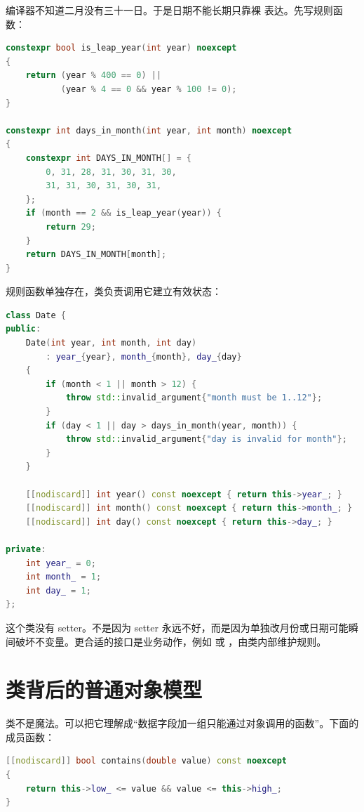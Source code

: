 编译器不知道二月没有三十一日。于是日期不能长期只靠裸  表达。先写规则函数：

\begin{lstlisting}[language=C++,caption={日期规则函数}]
constexpr bool is_leap_year(int year) noexcept
{
    return (year % 400 == 0) ||
           (year % 4 == 0 && year % 100 != 0);
}

constexpr int days_in_month(int year, int month) noexcept
{
    constexpr int DAYS_IN_MONTH[] = {
        0, 31, 28, 31, 30, 31, 30,
        31, 31, 30, 31, 30, 31,
    };
    if (month == 2 && is_leap_year(year)) {
        return 29;
    }
    return DAYS_IN_MONTH[month];
}
\end{lstlisting}

规则函数单独存在，类负责调用它建立有效状态：

\begin{lstlisting}[language=C++,caption={Date 构造边界}]
class Date {
public:
    Date(int year, int month, int day)
        : year_{year}, month_{month}, day_{day}
    {
        if (month < 1 || month > 12) {
            throw std::invalid_argument{"month must be 1..12"};
        }
        if (day < 1 || day > days_in_month(year, month)) {
            throw std::invalid_argument{"day is invalid for month"};
        }
    }

    [[nodiscard]] int year() const noexcept { return this->year_; }
    [[nodiscard]] int month() const noexcept { return this->month_; }
    [[nodiscard]] int day() const noexcept { return this->day_; }

private:
    int year_ = 0;
    int month_ = 1;
    int day_ = 1;
};
\end{lstlisting}

这个类没有 setter。不是因为 setter 永远不好，而是因为单独改月份或日期可能瞬间破坏不变量。更合适的接口是业务动作，例如  或 ，由类内部维护规则。

\section{类背后的普通对象模型}

类不是魔法。可以把它理解成“数据字段加一组只能通过对象调用的函数”。下面的成员函数：

\begin{lstlisting}[language=C++,caption={成员函数}]
[[nodiscard]] bool contains(double value) const noexcept
{
    return this->low_ <= value && value <= this->high_;
}
\end{lstlisting}

